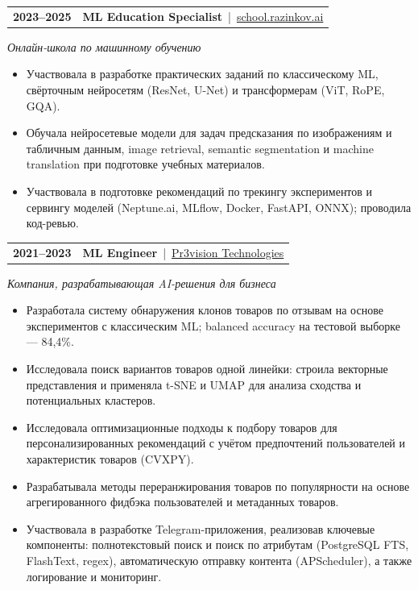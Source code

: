 \documentclass[12pt]{article}
\begin{document}
\begin{tabularx}{\textwidth}{@{}l >{\RaggedRight\arraybackslash}X@{}}
\textbf{2023--2025} & \textbf{ML Education Specialist} \,|\, \href{https://school.razinkov.ai/}{school.razinkov.ai}
\end{tabularx}
\vspace{1pt}
\textit{Онлайн-школа по машинному обучению}
\begin{itemize}
  \item Участвовала в разработке практических заданий по классическому ML, свёрточным нейросетям (ResNet, U-Net) и трансформерам (ViT, RoPE, GQA).
  \item Обучала нейросетевые модели для задач предсказания по изображениям и табличным данным, image retrieval, semantic segmentation и machine translation при подготовке учебных материалов.
  \item Участвовала в подготовке рекомендаций по трекингу экспериментов и сервингу моделей (Neptune.ai, MLflow, Docker, FastAPI, ONNX); проводила код-ревью.
\end{itemize}
\vspace{2pt}

\begin{tabularx}{\textwidth}{@{}l >{\RaggedRight\arraybackslash}X@{}}
\textbf{2021--2023} & \textbf{ML Engineer} \,|\, \href{https://pr3vision.com/}{Pr3vision Technologies}
\end{tabularx}
\vspace{1pt}
\textit{Компания, разрабатывающая AI-решения для бизнеса}
\begin{itemize}
  \item Разработала систему обнаружения клонов товаров по отзывам на основе экспериментов с классическим ML; balanced accuracy на тестовой выборке — 84,4\%.
  \item Исследовала поиск вариантов товаров одной линейки: строила векторные представления и применяла t-SNE и UMAP для анализа сходства и потенциальных кластеров.
  \item Исследовала оптимизационные подходы к подбору товаров для персонализированных рекомендаций с учётом предпочтений пользователей и характеристик товаров (CVXPY).
  \item Разрабатывала методы переранжирования товаров по популярности на основе агрегированного фидбэка пользователей и метаданных товаров.
  \item Участвовала в разработке Telegram-приложения, реализовав ключевые компоненты: полнотекстовый поиск и поиск по атрибутам (PostgreSQL FTS, FlashText, regex), автоматическую отправку контента (APScheduler), а также логирование и мониторинг.
\end{itemize}
\end{document}
